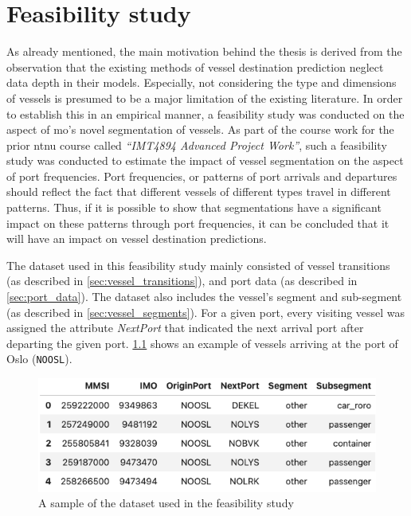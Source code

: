 \chapter{Feasibility study}

As already mentioned, the main motivation behind the thesis is derived from the observation that the existing methods of vessel destination prediction neglect data depth in their models. Especially, not considering the type and dimensions of vessels is presumed to be a major limitation of the existing literature. In order to establish this in an empirical manner, a feasibility study was conducted on the aspect of \acrfull{mo}'s novel segmentation of vessels. As part of the course work for the prior \acrshort{ntnu} course called \textit{“IMT4894 Advanced Project Work”}, such a feasibility study was  conducted to estimate the impact of vessel segmentation on the aspect of port frequencies. Port frequencies, or patterns of port arrivals and departures should reflect the fact that different vessels of different types travel in different patterns. Thus, if it is possible to show that segmentations have a significant impact on these patterns through port frequencies, it can be concluded that it will have an impact on vessel destination predictions.

The dataset used in this feasibility study mainly consisted of vessel transitions (as described in \cref{sec:vessel_transitions}), and port data (as described in \cref{sec:port_data}). The dataset also includes the vessel's segment and sub-segment (as described in \cref{sec:vessel_segments}). For a given port, every visiting vessel was assigned the attribute \textit{NextPort} that indicated the next arrival port after departing the given port. \cref{fig:apw_dataset} shows an example of vessels arriving at the port of Oslo (\texttt{NOOSL}).

\begin{figure}[htbp]
    \centering
    \includegraphics[width=.8\textwidth]{figures/apw/apw_dataset.png}
    \caption{A sample of the dataset used in the feasibility study}
    \label{fig:apw_dataset}
\end{figure}

